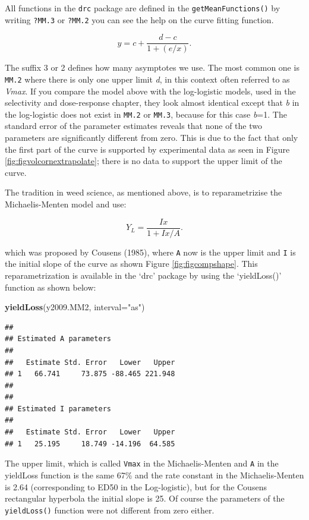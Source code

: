 \documentclass[letterpaper,]{book}
\newenvironment{Shaded}{\begin{snugshade}}{\end{snugshade}}
\newcommand{\DataTypeTok}[1]{\textcolor[rgb]{0.13,0.29,0.53}{#1}}
\newcommand{\KeywordTok}[1]{\textcolor[rgb]{0.13,0.29,0.53}{\textbf{#1}}}
\newcommand{\NormalTok}[1]{#1}
\newcommand{\StringTok}[1]{\textcolor[rgb]{0.31,0.60,0.02}{#1}}
\begin{document}
All functions in the \texttt{drc} package are defined in the \texttt{getMeanFunctions()} by writing \texttt{?MM.3} or \texttt{?MM.2} you can see the help on the curve fitting function.

\[y=c + \frac{d-c}{1+(e/x)} .\]

The suffix 3 or 2 defines how many asymptotes we use. The most common one is \texttt{MM.2} where there is only one upper limit \emph{d}, in this context often referred to as \emph{Vmax}. If you compare the model above with the log-logistic models, used in the selectivity and dose-response chapter, they look almost identical except that \emph{b} in the log-logistic does not exist in \texttt{MM.2} or \texttt{MM.3}, because for this case \emph{b}=1. The standard error of the parameter estimates reveals that none of the two parameters are significantly different from zero. This is due to the fact that only the first part of the curve is supported by experimental data as seen in Figure \ref{fig:figvolcornextrapolate}; there is no data to support the upper limit of the curve.

The tradition in weed science, as mentioned above, is to reparametrizise the Michaelis-Menten model and use:

\[Y_L = \frac{Ix}{1+Ix/A} .\]

which was proposed by Cousens (1985), where \texttt{A} now is the upper limit and \texttt{I} is the initial slope of the curve as shown Figure \ref{fig:figcompshape}. This reparametrization is available in the `drc' package by using the `yieldLoss()' function as shown below:

\begin{Shaded}
\begin{Highlighting}[]
\KeywordTok{yieldLoss}\NormalTok{(y2009.MM2, }\DataTypeTok{interval=}\StringTok{"as"}\NormalTok{)}
\end{Highlighting}
\end{Shaded}

\begin{verbatim}
## 
## Estimated A parameters
## 
##   Estimate Std. Error   Lower   Upper
## 1   66.741     73.875 -88.465 221.948
## 
## 
## Estimated I parameters
## 
##   Estimate Std. Error   Lower   Upper
## 1   25.195     18.749 -14.196  64.585
\end{verbatim}

The upper limit, which is called \texttt{Vmax} in the Michaelis-Menten and \texttt{A} in the yieldLoss function is the same 67\% and the rate constant in the Michaelis-Menten is 2.64 (corresponding to ED50 in the Log-logistic), but for the Cousens rectangular hyperbola the initial slope is 25. Of course the parameters of the \texttt{yieldLoss()} function were not different from zero either.
\end{document}
